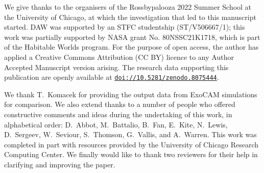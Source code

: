 \documentclass[trackchanges,linenumbers,twocolumn]{aastex631}
\begin{document}
\begin{CJK*}{UTF8}{gbsn}
\keywords{}






\newpage
We give thanks to the organisers of the Rossbypalooza 2022 Summer School at the University of Chicago, at which the investigation that led to this manuscript started. DAW was supported by an STFC studentship  (ST/V506667/1); this work was partially supported by NASA grant No. 80NSSC21K1718, which is part of the Habitable Worlds program. For the purpose of open access, the author has applied a Creative Commons Attribution (CC BY) licence to any Author Accepted Manuscript version arising. The research data supporting this publication are openly available at \href{https://doi.org/10.5281/zenodo.8075444}{\texttt{doi://10.5281/zenodo.8075444}}.

We thank T.~Komacek for providing the output data from ExoCAM simulations for comparison. We also extend thanks to a number of people who offered constructive comments and ideas during the undertaking of this work, in alphabetical order: D.~Abbot, M.~Battalio, B.~Fan, E.~Kite, N.~Lewis, D.~Sergeev, W.~Seviour, S.~Thomson, G.~Vallis, and A.~Warren. This work was completed in part with resources provided by the University of Chicago Research Computing Center. We finally would like to thank two reviewers for their help in clarifying and improving the paper.



{}


\end{CJK*}
\end{document}
